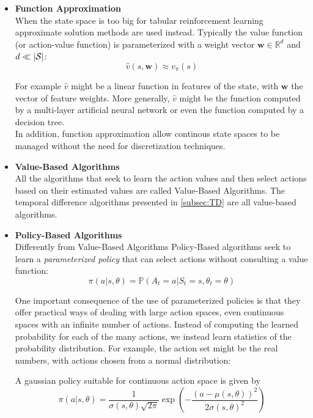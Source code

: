 \begin{itemize}
\item \textbf{Function Approximation} \\
When the state space is too big for tabular reinforcement learning approximate solution methods are used instead.
Typically the value function (or action-value function) is parameterized with a weight vector $\mathbf{w} \in \mathbb{R}^d$ and $d \ll |\mathcal{S}|$:
\begin{equation*}
    \hat v(s, \mathbf{w}) \approx v_\pi(s)
\end{equation*}

For example $\hat v$ might be a linear function in features of the state, with $\mathbf{w}$ the vector of feature weights.
More generally, $\hat v$ might be the function computed by a multi-layer artificial neural network or even the function computed
by a decision tree.
\\

In addition, function approximation allow continous state spaces to be managed without the need for discretization techniques.

\item \textbf{Value-Based Algorithms} \\
All the algorithms that seek to learn the action values and then select actions based on their estimated values are called Value-Based Algorithms.
The temporal difference algorithms presented in \ref{subsec:TD} are all value-based algorithms.
\item \textbf{Policy-Based Algorithms} \\
Differently from Value-Based Algorithms Policy-Based algorithms seek to learn a \textit{parameterized policy} that can select actions without consulting
a value function:
\begin{equation*}
    \pi(a|s,\theta) = \mathbb{P}(A_t = a | S_t = s, \theta_t = \theta)
\end{equation*}

One important consequence of the use of parameterized policies is that they offer practical ways of dealing with large action spaces,
even continuous spaces with an infinite number of actions. Instead of computing the learned probability for each of the many actions,
we instead learn statistics of the probability distribution. For example, the action set might be the real numbers, with actions chosen
from a normal distribution:

\begin{definition}
    A gaussian policy suitable for continuous action space is given by
    \begin{equation}
        \label{eq:gaussian_policy}
        \pi(a|s,\theta) = \frac{1}{\sigma(s, \theta)\sqrt{2 \pi}}\exp\left(-\frac{(a - \mu(s, \theta))^2}{2\sigma(s,\theta)^2}\right)
    \end{equation}
\end{definition}


\end{itemize}
